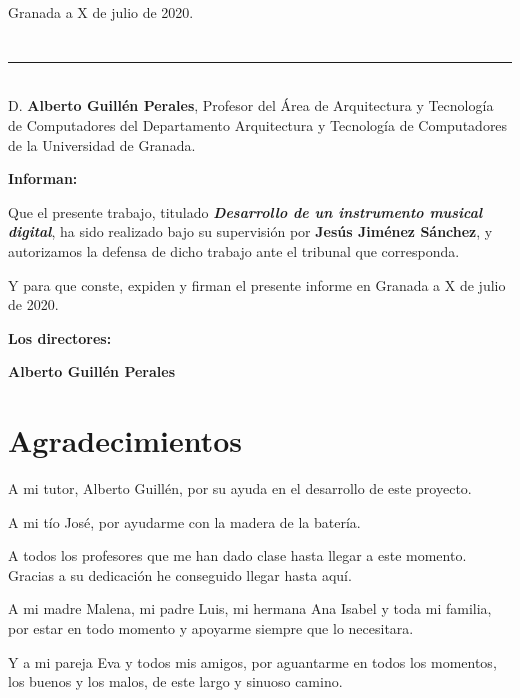 \begin{flushright}
    Granada a X de julio de 2020.
\end{flushright}

\chapter*{}   %
\thispagestyle{empty}

\noindent\rule[-1ex]{\textwidth}{2pt}\\[4.5ex]

D. \textbf{Alberto Guillén Perales}, Profesor del Área de Arquitectura y Tecnología de Computadores del Departamento
Arquitectura y Tecnología de Computadores de la Universidad de Granada.

\vspace{0.5cm}

\textbf{Informan:}

\vspace{0.5cm}

Que el presente trabajo, titulado \textit{\textbf{Desarrollo de un instrumento musical digital}}, ha sido realizado bajo
su supervisión por \textbf{Jesús Jiménez Sánchez}, y autorizamos la defensa de dicho trabajo ante el tribunal que
corresponda.

\vspace{0.5cm}

Y para que conste, expiden y firman el presente informe en Granada a X de julio de 2020.

\vspace{1cm}

\textbf{Los directores:}

\vspace{5cm}

\noindent \textbf{Alberto Guillén Perales}

\chapter*{Agradecimientos}
\thispagestyle{empty}

    \vspace{1cm}

A mi tutor, Alberto Guillén, por su ayuda en el desarrollo de este proyecto.

A mi tío José, por ayudarme con la madera de la batería.

A todos los profesores que me han dado clase hasta llegar a este momento. Gracias a su dedicación he conseguido llegar
hasta aquí.

A mi madre Malena, mi padre Luis, mi hermana Ana Isabel y toda mi familia, por estar en todo momento y apoyarme siempre
que lo necesitara.

Y a mi pareja Eva y todos mis amigos, por aguantarme en todos los momentos, los buenos y los malos, de este largo y
sinuoso camino.
